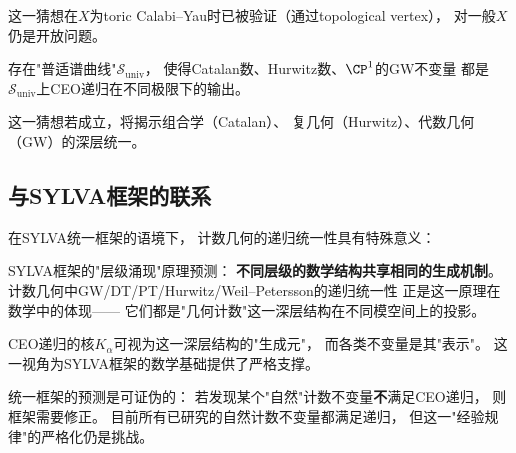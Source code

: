 这一猜想在$X$为toric Calabi--Yau时已被验证（通过topological vertex），
对一般$X$仍是开放问题。

\begin{conjecture}\label{conj:CHG}
存在"普适谱曲线"$\mathcal{S}_{\mathrm{univ}}$，
使得Catalan数、Hurwitz数、$\CP^1$的GW不变量
都是$\mathcal{S}_{\mathrm{univ}}$上CEO递归在不同极限下的输出。
\end{conjecture}

这一猜想若成立，将揭示组合学（Catalan）、
复几何（Hurwitz）、代数几何（GW）的深层统一。

\subsection{与SYLVA框架的联系}

在SYLVA统一框架的语境下，
计数几何的递归统一性具有特殊意义：

\begin{remark}[SYLVA视角]\label{rmk:sylva}
SYLVA框架的"层级涌现"原理预测：
\textbf{不同层级的数学结构共享相同的生成机制}。
计数几何中GW/DT/PT/Hurwitz/Weil--Petersson的递归统一性
正是这一原理在数学中的体现——
它们都是"几何计数"这一深层结构在不同模空间上的投影。

CEO递归的核$K_\alpha$可视为这一深层结构的"生成元"，
而各类不变量是其"表示"。
这一视角为SYLVA框架的数学基础提供了严格支撑。
\end{remark}

\begin{remark}[可证伪性]\label{rmk:falsifiable}
统一框架的预测是可证伪的：
若发现某个"自然"计数不变量\textbf{不}满足CEO递归，
则框架需要修正。
目前所有已研究的自然计数不变量都满足递归，
但这一"经验规律"的严格化仍是挑战。
\end{remark}
